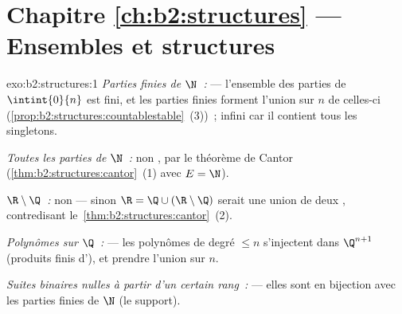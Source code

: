\section*{Chapitre \ref{ch:b2:structures} --- Ensembles et structures}

\begin{solution}{exo:b2:structures:1}
\emph{Parties finies de $\N$~:}  --- l'ensemble des parties
de $\intint{0}{n}$ est fini, et les parties finies forment l'union
 sur $n$ de celles-ci
(\cref{prop:b2:structures:countablestable}~(3))~; infini car il
contient tous les singletons.

\emph{Toutes les parties de $\N$~:} non , par le théorème de
Cantor (\cref{thm:b2:structures:cantor}~(1) avec $E = \N$).

\emph{$\R \setminus \Q$~:} non  --- sinon $\R = \Q \cup
(\R\setminus\Q)$ serait une union de deux ,
contredisant le~\cref{thm:b2:structures:cantor}~(2).

\emph{Polynômes sur $\Q$~:}  --- les polynômes de degré
$\leq n$ s'injectent dans $\Q^{n+1}$ (produits finis d'), et prendre l'union sur $n$.

\emph{Suites binaires nulles à partir d'un certain rang~:} 
--- elles sont en bijection avec les parties finies de $\N$ (le
support).
\end{solution}

